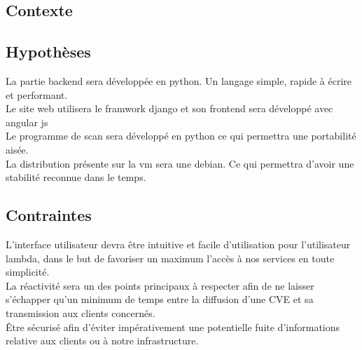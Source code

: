 \textcolor{myBlue}{\chapter{Contexte}}
\section{Hypothèses}
La partie backend sera développée en python. Un langage simple, rapide à écrire et performant.\\
Le site web utilisera le framwork django et son frontend sera développé avec angular js\\
Le programme de scan sera développé en python ce qui permettra une portabilité aisée.\\
La distribution présente sur la vm sera une debian. Ce qui permettra d’avoir une stabilité reconnue dans le temps.\\

\section{Contraintes}
L’interface utilisateur devra être intuitive et facile d’utilisation pour l’utilisateur lambda, dans le but de favoriser un maximum l’accès à nos services en toute simplicité.\\
La réactivité sera un des points principaux à respecter afin de ne laisser s’échapper qu’un minimum de temps entre la diffusion d’une CVE et sa transmission aux clients concernés.\\
Être sécurisé afin d’éviter impérativement une potentielle fuite d’informations relative aux clients ou à notre infrastructure.\\
